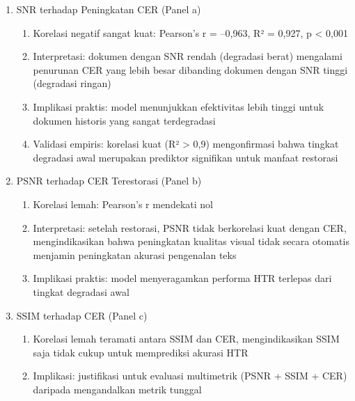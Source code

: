 \begin{enumerate}[leftmargin=1.5em, labelsep=0.5em, itemindent=0pt, label=\arabic*., topsep=0pt, partopsep=0pt]
    \item SNR terhadap Peningkatan CER (Panel a)
    
    \begin{enumerate}[leftmargin=1.5em, labelsep=0.5em, itemindent=0pt, noitemsep, topsep=0pt, label=\alph*)]
        \item Korelasi negatif sangat kuat: Pearson's r = --0,963, R² = 0,927, p < 0,001
        \item Interpretasi: dokumen dengan SNR rendah (degradasi berat) mengalami penurunan CER yang lebih besar dibanding dokumen dengan SNR tinggi (degradasi ringan)
        \item Implikasi praktis: model menunjukkan efektivitas lebih tinggi untuk dokumen historis yang sangat terdegradasi
        \item Validasi empiris: korelasi kuat (R² > 0,9) mengonfirmasi bahwa tingkat degradasi awal merupakan prediktor signifikan untuk manfaat restorasi
    \end{enumerate}

    \item PSNR terhadap CER Terestorasi (Panel b)
    
    \begin{enumerate}[leftmargin=1.5em, labelsep=0.5em, itemindent=0pt, noitemsep, topsep=0pt, label=\alph*)]
        \item Korelasi lemah: Pearson's r mendekati nol
        \item Interpretasi: setelah restorasi, PSNR tidak berkorelasi kuat dengan CER, mengindikasikan bahwa peningkatan kualitas visual tidak secara otomatis menjamin peningkatan akurasi pengenalan teks
        \item Implikasi praktis: model menyeragamkan performa HTR terlepas dari tingkat degradasi awal
    \end{enumerate}

    \item SSIM terhadap CER (Panel c)
    
    \begin{enumerate}[leftmargin=1.5em, labelsep=0.5em, itemindent=0pt, noitemsep, topsep=0pt, label=\alph*)]
        \item Korelasi lemah teramati antara SSIM dan CER, mengindikasikan SSIM saja tidak cukup untuk memprediksi akurasi HTR
        \item Implikasi: justifikasi untuk evaluasi multimetrik (PSNR + SSIM + CER) daripada mengandalkan metrik tunggal
    \end{enumerate}


\end{enumerate}
